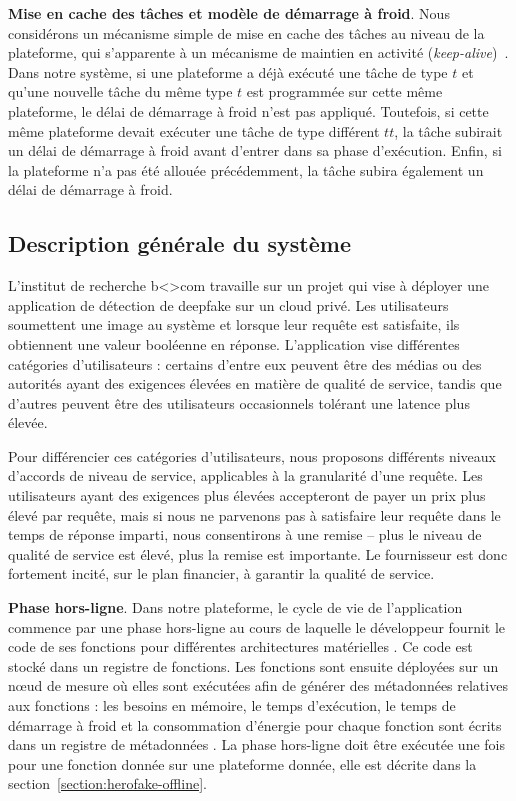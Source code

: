 \textbf{Mise en cache des tâches et modèle de démarrage à froid}. Nous considérons un mécanisme simple de mise en cache des tâches au niveau de la plateforme, qui s'apparente à un mécanisme de maintien en activité (\textit{keep-alive})~\cite{7279063}. Dans notre système, si une plateforme a déjà exécuté une tâche de type $t$ et qu'une nouvelle tâche du même type $t$ est programmée sur cette même plateforme, le délai de démarrage à froid n'est pas appliqué. Toutefois, si cette même plateforme devait exécuter une tâche de type différent $tt$, la tâche subirait un délai de démarrage à froid avant d'entrer dans sa phase d'exécution. Enfin, si la plateforme n'a pas été allouée précédemment, la tâche subira également un délai de démarrage à froid.

\subsection{Description générale du système}

L'institut de recherche b{\textless\textgreater}com travaille sur un projet qui vise à déployer une application de détection de deepfake sur un cloud privé. Les utilisateurs soumettent une image au système et lorsque leur requête est satisfaite, ils obtiennent une valeur booléenne en réponse. L'application vise différentes catégories d'utilisateurs : certains d'entre eux peuvent être des médias ou des autorités ayant des exigences élevées en matière de qualité de service, tandis que d'autres peuvent être des utilisateurs occasionnels tolérant une latence plus élevée.

Pour différencier ces catégories d'utilisateurs, nous proposons différents niveaux d'accords de niveau de service, applicables à la granularité d'une requête. Les utilisateurs ayant des exigences plus élevées accepteront de payer un prix plus élevé par requête, mais si nous ne parvenons pas à satisfaire leur requête dans le temps de réponse imparti, nous consentirons à une remise -- plus le niveau de qualité de service est élevé, plus la remise est importante. Le fournisseur est donc fortement incité, sur le plan financier, à garantir la qualité de service.

\textbf{Phase hors-ligne}. Dans notre plateforme, le cycle de vie de l'application commence par une phase hors-ligne au cours de laquelle le développeur fournit le code de ses fonctions pour différentes architectures matérielles . Ce code est stocké dans un registre de fonctions. Les fonctions sont ensuite déployées sur un nœud de mesure  où elles sont exécutées afin de générer des métadonnées relatives aux fonctions : les besoins en mémoire, le temps d'exécution, le temps de démarrage à froid et la consommation d'énergie pour chaque fonction sont écrits dans un registre de métadonnées . La phase hors-ligne doit être exécutée une fois pour une fonction donnée sur une plateforme donnée, elle est décrite dans la section~\ref{section:herofake-offline}.

